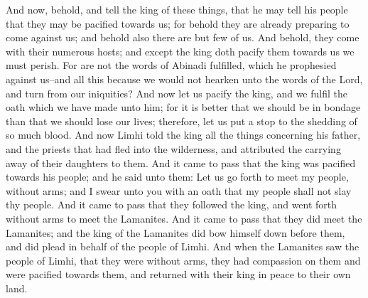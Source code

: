 And now, behold, and tell the king of these things, that he may tell his people that they may be pacified towards us; for behold they are already preparing to come against us; and behold also there are but few of us.
\bverse \iffalse And behold, they come with their numerous hosts; and except the king doth pacify them towards us we must perish. \fi
And behold, they come with their numerous hosts; and except the king doth pacify them towards us we must perish.
\bverse \iffalse For are not the words of Abinadi fulfilled, which he prophesied against us--and all this because we would not hearken unto the words of the Lord, and turn from our iniquities? \fi
For are not the words of Abinadi fulfilled, which he prophesied against us--and all this because we would not hearken unto the words of the Lord, and turn from our iniquities?
\bverse \iffalse And now let us pacify the king, and we fulfil the oath which we have made unto him; for it is better that we should be in bondage than that we should lose our lives; therefore, let us put a stop to the shedding of so much blood. \fi
And now let us pacify the king, and we fulfil the oath which we have made unto him; for it is better that we should be in bondage than that we should lose our lives; therefore, let us put a stop to the shedding of so much blood.
\bverse \iffalse And now Limhi told the king all the things concerning his father, and the priests that had fled into the wilderness, and attributed the carrying away of their daughters to them. \fi
And now Limhi told the king all the things concerning his father, and the priests that had fled into the wilderness, and attributed the carrying away of their daughters to them.
\bverse \iffalse And it came to pass that the king was pacified towards his people; and he said unto them: Let us go forth to meet my people, without arms; and I swear unto you with an oath that my people shall not slay thy people. \fi
And it came to pass that the king was pacified towards his people; and he said unto them: Let us go forth to meet my people, without arms; and I swear unto you with an oath that my people shall not slay thy people.
\bverse \iffalse And it came to pass that they followed the king, and went forth without arms to meet the Lamanites. And it came to pass that they did meet the Lamanites; and the king of the Lamanites did bow himself down before them, and did plead in behalf of the people of Limhi. \fi
And it came to pass that they followed the king, and went forth without arms to meet the Lamanites. And it came to pass that they did meet the Lamanites; and the king of the Lamanites did bow himself down before them, and did plead in behalf of the people of Limhi.
\bverse \iffalse And when the Lamanites saw the people of Limhi, that they were without arms, they had compassion on them and were pacified towards them, and returned with their king in peace to their own land. \fi
And when the Lamanites saw the people of Limhi, that they were without arms, they had compassion on them and were pacified towards them, and returned with their king in peace to their own land.

